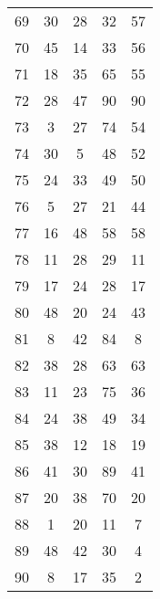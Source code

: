 \documentclass[a4paper,10pt,ngerman]{scrartcl}
\begin{document}
\begin{longtable}[c]{c|c|c|c|c}
    69 & 30 & 28 & 32 & 57 \\
    70 & 45 & 14 & 33 & 56 \\
    71 & 18 & 35 & 65 & 55 \\
    72 & 28 & 47 & 90 & 90 \\
    73 & 3 & 27 & 74 & 54 \\
    74 & 30 & 5 & 48 & 52 \\
    75 & 24 & 33 & 49 & 50 \\
    76 & 5 & 27 & 21 & 44 \\
    77 & 16 & 48 & 58 & 58 \\
    78 & 11 & 28 & 29 & 11 \\
    79 & 17 & 24 & 28 & 17 \\
    80 & 48 & 20 & 24 & 43 \\
    81 & 8 & 42 & 84 & 8 \\
    82 & 38 & 28 & 63 & 63 \\
    83 & 11 & 23 & 75 & 36 \\
    84 & 24 & 38 & 49 & 34 \\
    85 & 38 & 12 & 18 & 19 \\
    86 & 41 & 30 & 89 & 41 \\
    87 & 20 & 38 & 70 & 20 \\
    88 & 1 & 20 & 11 & 7 \\
    89 & 48 & 42 & 30 & 4 \\
    90 & 8 & 17 & 35 & 2
\end{longtable}
\end{document}
